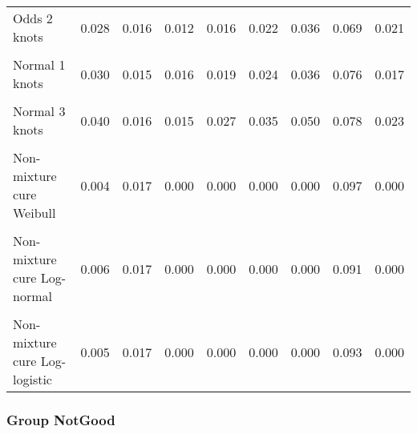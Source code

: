\documentclass[
]{article}
\begin{document}
\begin{table}[H]
{\begin{tabular}[t]{lrrrrrrrr}
Odds 2 knots & 0.028 & 0.016 & 0.012 & 0.016 & 0.022 & 0.036 & 0.069 & 0.021\\
\cellcolor{gray!10}{Odds 3 knots} & \cellcolor{gray!10}{0.034} & \cellcolor{gray!10}{0.019} & \cellcolor{gray!10}{0.015} & \cellcolor{gray!10}{0.019} & \cellcolor{gray!10}{0.027} & \cellcolor{gray!10}{0.045} & \cellcolor{gray!10}{0.077} & \cellcolor{gray!10}{0.026}\\
Normal 1 knots & 0.030 & 0.015 & 0.016 & 0.019 & 0.024 & 0.036 & 0.076 & 0.017\\
\cellcolor{gray!10}{Normal 2 knots} & \cellcolor{gray!10}{0.030} & \cellcolor{gray!10}{0.015} & \cellcolor{gray!10}{0.016} & \cellcolor{gray!10}{0.019} & \cellcolor{gray!10}{0.025} & \cellcolor{gray!10}{0.036} & \cellcolor{gray!10}{0.076} & \cellcolor{gray!10}{0.017}\\
Normal 3 knots & 0.040 & 0.016 & 0.015 & 0.027 & 0.035 & 0.050 & 0.078 & 0.023\\
\cellcolor{gray!10}{Mixture cure Weibull} & \cellcolor{gray!10}{0.004} & \cellcolor{gray!10}{0.017} & \cellcolor{gray!10}{0.000} & \cellcolor{gray!10}{0.000} & \cellcolor{gray!10}{0.000} & \cellcolor{gray!10}{0.000} & \cellcolor{gray!10}{0.097} & \cellcolor{gray!10}{0.000}\\
Non-mixture cure Weibull & 0.004 & 0.017 & 0.000 & 0.000 & 0.000 & 0.000 & 0.097 & 0.000\\
\cellcolor{gray!10}{Mixture cure Log-normal} & \cellcolor{gray!10}{0.005} & \cellcolor{gray!10}{0.017} & \cellcolor{gray!10}{0.000} & \cellcolor{gray!10}{0.000} & \cellcolor{gray!10}{0.000} & \cellcolor{gray!10}{0.000} & \cellcolor{gray!10}{0.091} & \cellcolor{gray!10}{0.000}\\
Non-mixture cure Log-normal & 0.006 & 0.017 & 0.000 & 0.000 & 0.000 & 0.000 & 0.091 & 0.000\\
\cellcolor{gray!10}{Mixture cure Log-logistic} & \cellcolor{gray!10}{0.005} & \cellcolor{gray!10}{0.017} & \cellcolor{gray!10}{0.000} & \cellcolor{gray!10}{0.000} & \cellcolor{gray!10}{0.000} & \cellcolor{gray!10}{0.000} & \cellcolor{gray!10}{0.093} & \cellcolor{gray!10}{0.000}\\
Non-mixture cure Log-logistic & 0.005 & 0.017 & 0.000 & 0.000 & 0.000 & 0.000 & 0.093 & 0.000\\
\bottomrule
\end{tabular}}
\end{table}

\clearpage

\subsubsection{Group NotGood}\label{group-notgood}
\end{document}
